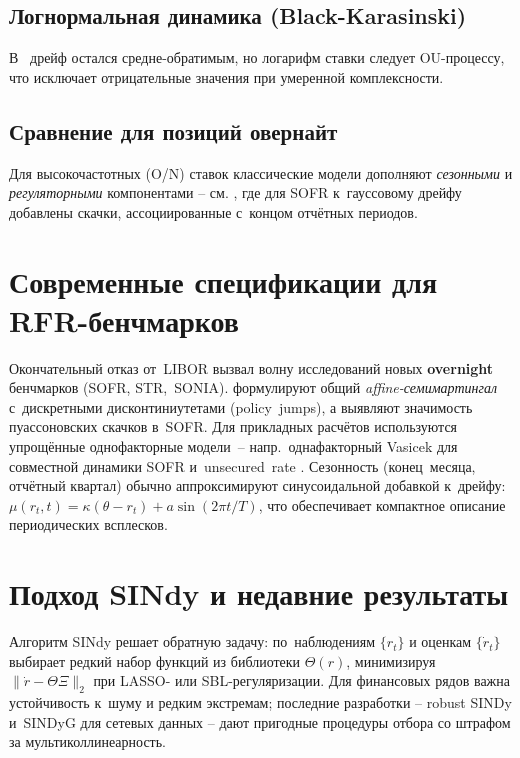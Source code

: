 \subsection{Логнормальная динамика (Black-Karasinski)}
В \cite{BlackKarasinski1991} дрейф остался
средне-обратимым, но логарифм ставки следует OU-процессу,
что исключает отрицательные значения при умеренной
комплексности.

\subsection{Сравнение для позиций овернайт}
Для высокочастотных (O/N) ставок классические
модели дополняют \emph{сезонными} и \emph{регуляторными}
компонентами -- см. \cite{Beltran2024},
где для SOFR к гауссовому дрейфу добавлены скачки,
ассоциированные с концом отчётных периодов.

\section{Современные спецификации для RFR-бенчмарков}

Окончательный отказ от LIBOR вызвал волну исследований
новых \textbf{overnight} бенчмарков (SOFR, \texteuro STR, SONIA).  
\cite{Fontana2022} формулируют общий
\emph{affine-семимартингал} с дискретными
дисконтиниутетами (policy jumps), а
\cite{Beltran2024} выявляют значимость пуассоновских
скачков в SOFR.  
Для прикладных расчётов используются упрощённые
однофакторные модели -- напр.\ однафакторный
Vasicek для совместной динамики SOFR и unsecured rate
\cite{Smith2025}.  
Сезонность (конец месяца, отчётный квартал)
обычно аппроксимируют синусоидальной добавкой
к дрейфу: $\mu(r_t,t)=\kappa(\theta-r_t)+a\sin(2\pi t/T)$,
что обеспечивает компактное описание периодических всплесков.

\section{Подход SINdy и недавние результаты}

Алгоритм SINdy \cite{BruntonKutz2022}
решает обратную задачу: по наблюдениям $\{r_t\}$ и
оценкам $\{\dot r_t\}$ выбирает редкий набор
функций из библиотеки $\Theta(r)$, минимизируя
$\|\dot r - \Theta \Xi\|_2$ при LASSO- или
SBL-регуляризации.  
Для финансовых рядов важна устойчивость к шуму и
редким экстремам; последние разработки --
robust SINDy \cite{Fung2025} и SINDyG
для сетевых данных \cite{SINDyG2024} --
дают пригодные процедуры отбора
со штрафом за мультиколлинеарность.

